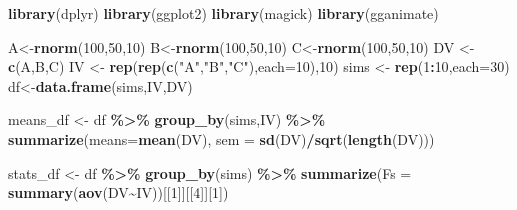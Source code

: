 \documentclass[
]{book}
\newenvironment{Shaded}{\begin{snugshade}}{\end{snugshade}}
\newcommand{\AttributeTok}[1]{\textcolor[rgb]{0.13,0.29,0.53}{#1}}
\newcommand{\DecValTok}[1]{\textcolor[rgb]{0.00,0.00,0.81}{#1}}
\newcommand{\FunctionTok}[1]{\textcolor[rgb]{0.13,0.29,0.53}{\textbf{#1}}}
\newcommand{\NormalTok}[1]{#1}
\newcommand{\OtherTok}[1]{\textcolor[rgb]{0.56,0.35,0.01}{#1}}
\newcommand{\SpecialCharTok}[1]{\textcolor[rgb]{0.81,0.36,0.00}{\textbf{#1}}}
\newcommand{\StringTok}[1]{\textcolor[rgb]{0.31,0.60,0.02}{#1}}
\begin{document}
\begin{Shaded}
\begin{Highlighting}[]
\FunctionTok{library}\NormalTok{(dplyr)}
\FunctionTok{library}\NormalTok{(ggplot2)}
\FunctionTok{library}\NormalTok{(magick)}
\FunctionTok{library}\NormalTok{(gganimate)}


\NormalTok{A}\OtherTok{\textless{}{-}}\FunctionTok{rnorm}\NormalTok{(}\DecValTok{100}\NormalTok{,}\DecValTok{50}\NormalTok{,}\DecValTok{10}\NormalTok{)}
\NormalTok{B}\OtherTok{\textless{}{-}}\FunctionTok{rnorm}\NormalTok{(}\DecValTok{100}\NormalTok{,}\DecValTok{50}\NormalTok{,}\DecValTok{10}\NormalTok{)}
\NormalTok{C}\OtherTok{\textless{}{-}}\FunctionTok{rnorm}\NormalTok{(}\DecValTok{100}\NormalTok{,}\DecValTok{50}\NormalTok{,}\DecValTok{10}\NormalTok{)}
\NormalTok{DV }\OtherTok{\textless{}{-}} \FunctionTok{c}\NormalTok{(A,B,C)}
\NormalTok{IV }\OtherTok{\textless{}{-}} \FunctionTok{rep}\NormalTok{(}\FunctionTok{rep}\NormalTok{(}\FunctionTok{c}\NormalTok{(}\StringTok{"A"}\NormalTok{,}\StringTok{"B"}\NormalTok{,}\StringTok{"C"}\NormalTok{),}\AttributeTok{each=}\DecValTok{10}\NormalTok{),}\DecValTok{10}\NormalTok{)}
\NormalTok{sims }\OtherTok{\textless{}{-}} \FunctionTok{rep}\NormalTok{(}\DecValTok{1}\SpecialCharTok{:}\DecValTok{10}\NormalTok{,}\AttributeTok{each=}\DecValTok{30}\NormalTok{)}
\NormalTok{df}\OtherTok{\textless{}{-}}\FunctionTok{data.frame}\NormalTok{(sims,IV,DV)}

\NormalTok{means\_df }\OtherTok{\textless{}{-}}\NormalTok{ df }\SpecialCharTok{\%\textgreater{}\%}
  \FunctionTok{group\_by}\NormalTok{(sims,IV) }\SpecialCharTok{\%\textgreater{}\%}
  \FunctionTok{summarize}\NormalTok{(}\AttributeTok{means=}\FunctionTok{mean}\NormalTok{(DV),}
            \AttributeTok{sem =} \FunctionTok{sd}\NormalTok{(DV)}\SpecialCharTok{/}\FunctionTok{sqrt}\NormalTok{(}\FunctionTok{length}\NormalTok{(DV)))}

\NormalTok{stats\_df }\OtherTok{\textless{}{-}}\NormalTok{ df }\SpecialCharTok{\%\textgreater{}\%}
  \FunctionTok{group\_by}\NormalTok{(sims) }\SpecialCharTok{\%\textgreater{}\%}
  \FunctionTok{summarize}\NormalTok{(}\AttributeTok{Fs =} \FunctionTok{summary}\NormalTok{(}\FunctionTok{aov}\NormalTok{(DV}\SpecialCharTok{\textasciitilde{}}\NormalTok{IV))[[}\DecValTok{1}\NormalTok{]][[}\DecValTok{4}\NormalTok{]][}\DecValTok{1}\NormalTok{])}


\end{Highlighting}
\end{Shaded}
\end{document}
